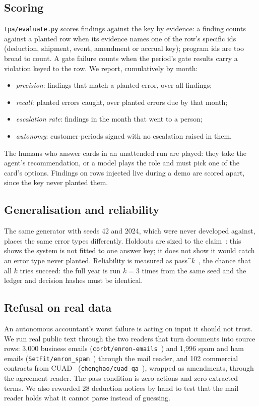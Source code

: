 \documentclass[10pt,letterpaper]{article}
\begin{document}
\subsection{Scoring}
\texttt{tpa/evaluate.py} scores findings against the key by evidence: a finding counts against a planted
row when its evidence names one of the row's specific ids (deduction, shipment, event, amendment or accrual
key); program ids are too broad to count. A gate failure counts when the period's gate results carry a
violation keyed to the row. We report, cumulatively by month:
\begin{itemize}\itemsep0pt
\item \emph{precision}: findings that match a planted error, over all findings;
\item \emph{recall}: planted errors caught, over planted errors due by that month;
\item \emph{escalation rate}: findings in the month that went to a person;
\item \emph{autonomy}: customer-periods signed with no escalation raised in them.
\end{itemize}
The humans who answer cards in an unattended run are played: they take the agent's recommendation, or a
model plays the role and must pick one of the card's options. Findings on rows injected live during a
demo are scored apart, since the key never planted them.

\subsection{Generalisation and reliability}
The same generator with seeds 42 and 2024, which were never developed against, places the same error types
differently. Holdouts are sized to the claim~\cite{kapoor}: this shows the system is not fitted to one answer key; it does not show it would catch an error
type never planted. Reliability is measured as pass\textasciicircum{}$k$~\cite{taubench}, the chance that all $k$ tries succeed: the full year is run $k=3$ times
from the same seed and the ledger and decision hashes must be identical.

\subsection{Refusal on real data}
\label{sec:escalating-method}
An autonomous accountant's worst failure is acting on input it should not trust. We run real public text
through the two readers that turn documents into source rows: 3,000 business emails
(\texttt{corbt/enron-emails}~\cite{hf-enron}) and 1,996 spam and ham emails (\texttt{SetFit/enron\_spam}~\cite{hf-spam}) through the mail
reader, and 102 commercial contracts from CUAD~\cite{cuad} (\texttt{chenghao/cuad\_qa}~\cite{hf-cuad}), wrapped as amendments, through
the agreement reader. The pass condition is zero actions and zero extracted terms. We also reworded 28
deduction notices by hand to test that the mail reader holds what it cannot parse instead of guessing.
\end{document}
